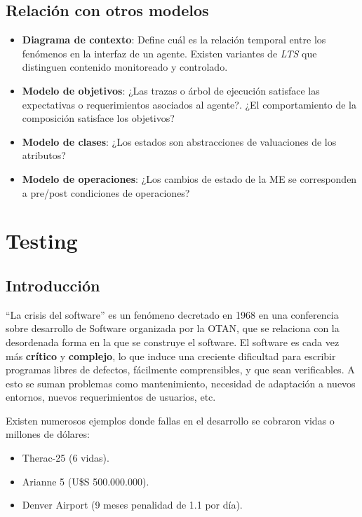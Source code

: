 \documentclass[]{article}
\begin{document}
\subsection{Relación con otros modelos}
\begin{itemize}
	\item \textbf{Diagrama de contexto}: Define cuál es la relación temporal entre los fenómenos en la interfaz de un agente. Existen variantes de \textit{LTS} que distinguen contenido monitoreado y controlado.
	\item \textbf{Modelo de objetivos}: ¿Las trazas o árbol de ejecución satisface las expectativas o requerimientos asociados al agente?. ¿El comportamiento de la composición satisface los objetivos?
	\item \textbf{Modelo de clases}: ¿Los estados son abstracciones de valuaciones de los atributos?
	\item \textbf{Modelo de operaciones}: ¿Los cambios de estado de la ME se corresponden a pre/post condiciones de operaciones?
\end{itemize}

\newpage

%
%
%
%
%
%
%
%
%
%
%
%
%
%
%
%
%
%
%
%
%
%
%
%
%
%
%
%
%
%

\section{Testing}
\subsection{Introducción}
``La crisis del software'' es un fenómeno decretado en 1968 en una conferencia sobre desarrollo de Software organizada por la OTAN, que se relaciona con la desordenada forma en la que se construye el software. El software es cada vez más \textbf{crítico} y \textbf{complejo}, lo que induce una creciente dificultad para escribir programas libres de defectos, fácilmente comprensibles, y que sean verificables. A esto se suman problemas como mantenimiento, necesidad de adaptación a nuevos entornos, nuevos requerimientos de usuarios, etc.

Existen numerosos ejemplos donde fallas en el desarrollo se cobraron vidas o millones de dólares:
\begin{itemize}
	\item Therac-25 (6 vidas).
	\item Arianne 5 (U\$S 500.000.000).
	\item Denver Airport (9 meses penalidad de 1.1 por día).
\end{itemize}
\end{document}
